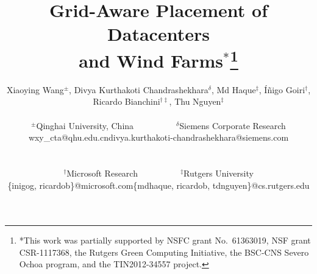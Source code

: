 \documentclass[conference]{IEEEtran}
\begin{document}
\title{Grid-Aware Placement of Datacenters\\and Wind
  Farms$^*$\thanks{*This work was partially supported by NSFC
    grant No.~61363019, NSF grant CSR-1117368, the Rutgers Green Computing
    Initiative, the BSC-CNS Severo Ochoa program, and the
    TIN2012-34557 project.}
\vspace{-0.5in}
}

%
 \author{
Xiaoying Wang$^\pm$, Divya Kurthakoti Chandrashekhara$^\delta$, Md
Haque$^\ddag$, \'I\~{n}igo Goiri$^{\dag}$, Ricardo
Bianchini$^{\dag\ddag}$, Thu Nguyen$^\ddag$\\
[.075in]
\begin{tabular}{ccc}
  $^\pm$Qinghai University, China & ~~~~~~~~~~ & $^\delta$Siemens Corporate Research \\
  wxy\_cta@qhu.edu.cn & & divya.kurthakoti-chandrashekhara@siemens.com \\
\end{tabular}\\
[0.075in]
\begin{tabular}{ccc}
    $^\dag$Microsoft Research & ~~~~~~~~~~ & $^\ddag$Rutgers University \\
    \{inigog, ricardob\}@microsoft.com & & \{mdhaque, ricardob, tdnguyen\}@cs.rutgers.edu\\
\end{tabular}
 }

\end{document}

